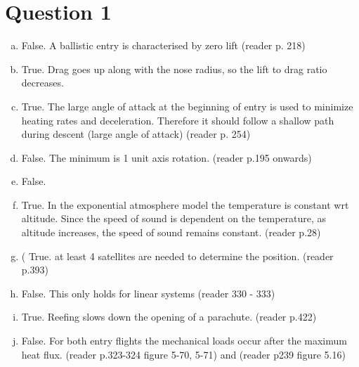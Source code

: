 \section{ Question 1 }\label{sec:q1} 
\begin{enumerate}[a.]
\item
False. A ballistic entry is characterised by zero lift (reader p. 218)
\item True. Drag goes up along with the nose radius, so the lift to drag ratio decreases.
\item True. The large angle of attack at the beginning of entry is used to minimize heating rates and deceleration. Therefore it should follow a shallow path during descent (large angle of attack) (reader p. 254)
\item False. The minimum is 1 unit axis rotation. (reader p.195 onwards)
\item False.
\item True. In the exponential atmosphere model the temperature is constant wrt altitude. Since the speed of sound is dependent on the temperature, as altitude increases, the speed of sound remains constant. (reader p.28)
\item( True. at least 4 satellites are needed to determine the position. (reader p.393)
\item False. This only holds for linear systems (reader 330 - 333)
\item True. Reefing slows down the opening of a parachute. (reader p.422)
\item False. For both entry flights the mechanical loads occur after the maximum heat flux. (reader p.323-324 figure 5-70, 5-71) and (reader p239 figure 5.16) 
\end{enumerate}